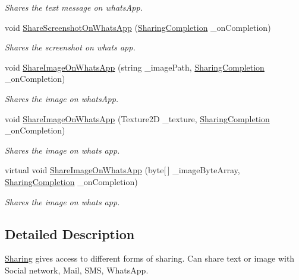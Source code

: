 \begin{DoxyCompactItemize}
\begin{DoxyCompactList}\small\item\em Shares the text message on whats\+App. \end{DoxyCompactList}\item 
void \hyperlink{class_voxel_busters_1_1_native_plugins_1_1_sharing_a796873b90275f6f6d82a3a54a4749b70}{Share\+Screenshot\+On\+Whats\+App} (\hyperlink{class_voxel_busters_1_1_native_plugins_1_1_sharing_a61017c6d51721d2ca6154ffef15a6555}{Sharing\+Completion} \+\_\+on\+Completion)
\begin{DoxyCompactList}\small\item\em Shares the screenshot on whats app. \end{DoxyCompactList}\item 
void \hyperlink{class_voxel_busters_1_1_native_plugins_1_1_sharing_adc1c0476ec01d117a27d48f29309474d}{Share\+Image\+On\+Whats\+App} (string \+\_\+image\+Path, \hyperlink{class_voxel_busters_1_1_native_plugins_1_1_sharing_a61017c6d51721d2ca6154ffef15a6555}{Sharing\+Completion} \+\_\+on\+Completion)
\begin{DoxyCompactList}\small\item\em Shares the image on whats\+App. \end{DoxyCompactList}\item 
void \hyperlink{class_voxel_busters_1_1_native_plugins_1_1_sharing_a7a4e07d1c6db017fba76c3fd90906890}{Share\+Image\+On\+Whats\+App} (Texture2\+D \+\_\+texture, \hyperlink{class_voxel_busters_1_1_native_plugins_1_1_sharing_a61017c6d51721d2ca6154ffef15a6555}{Sharing\+Completion} \+\_\+on\+Completion)
\begin{DoxyCompactList}\small\item\em Shares the image on whats app. \end{DoxyCompactList}\item 
virtual void \hyperlink{class_voxel_busters_1_1_native_plugins_1_1_sharing_a91ff529bec29867cd922b77ab19dc7dc}{Share\+Image\+On\+Whats\+App} (byte\mbox{[}$\,$\mbox{]} \+\_\+image\+Byte\+Array, \hyperlink{class_voxel_busters_1_1_native_plugins_1_1_sharing_a61017c6d51721d2ca6154ffef15a6555}{Sharing\+Completion} \+\_\+on\+Completion)
\begin{DoxyCompactList}\small\item\em Shares the image on whats app. \end{DoxyCompactList}\end{DoxyCompactItemize}


\subsection{Detailed Description}
\hyperlink{class_voxel_busters_1_1_native_plugins_1_1_sharing}{Sharing} gives access to different forms of sharing. Can share text or image with Social network, Mail, S\+M\+S, Whats\+App. 



